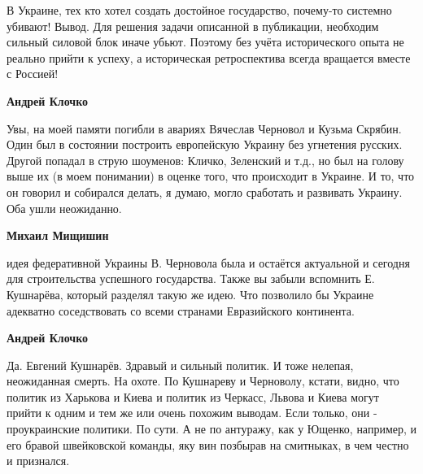 \begin{itemize}

В Украине, тех кто хотел создать достойное государство, почему-то системно
убивают! Вывод. Для решения задачи описанной в публикации, необходим сильный
силовой блок иначе убьют. Поэтому без учёта исторического опыта не реально
прийти к успеху, а историческая ретроспектива всегда вращается вместе с
Россией!

\begin{itemize}
 
\textbf{Андрей Клочко} 

Увы, на моей памяти погибли в авариях Вячеслав Черновол
и Кузьма Скрябин. Один был в состоянии построить европейскую Украину без
угнетения русских. Другой попадал в струю шоуменов: Кличко, Зеленский и т.д.,
но был на голову выше их (в моем понимании) в оценке того, что происходит в
Украине. И то, что он говорил и собирался делать, я думаю, могло сработать и
развивать Украину. Оба ушли неожиданно.

 
\textbf{Михаил Мищишин} 

идея федеративной Украины В. Черновола была и остаётся
актуальной и сегодня для строительства успешного государства. Также вы забыли
вспомнить Е. Кушнарёва, который разделял такую же идею. Что позволило бы
Украине адекватно соседствовать со всеми странами Евразийского континента.

 
\textbf{Андрей Клочко} 

Да. Евгений Кушнарёв. Здравый и сильный политик. И тоже
нелепая, неожиданная смерть. На охоте. По Кушнареву и Черноволу, кстати, видно,
что политик из Харькова и Киева и политик из Черкасс, Львова и Киева могут
прийти к одним и тем же или очень похожим выводам. Если только, они -
проукраинские политики. По сути. А не по антуражу, как у Ющенко, например, и
его бравой швейковской команды, яку вин позбырав на смитныках, в чем честно и
признался.


\end{itemize}
\end{itemize}
